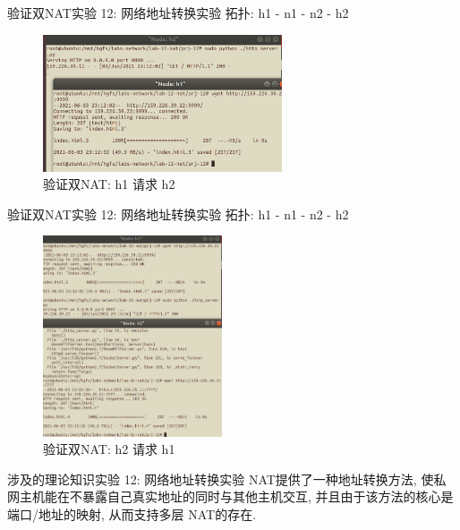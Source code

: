 \documentclass{beamer}
\begin{document}
\begin{frame}{验证双NAT}{实验 12: 网络地址转换实验}
    拓扑: h1 - n1 - n2 - h2
    \begin{figure}[h]
        \centering %
        \includegraphics[width=200pt]{
            ../lab-12-nat/readme.assets/p3-a.png}
        \caption{验证双NAT: h1 请求 h2} %
    \end{figure}
\end{frame}
\begin{frame}{验证双NAT}{实验 12: 网络地址转换实验}
    拓扑: h1 - n1 - n2 - h2
    \begin{figure}[h]
        \centering %
        \includegraphics[width=150pt]{
            ../lab-12-nat/readme.assets/p3-b.png}
        \caption{验证双NAT: h2 请求 h1} %
    \end{figure}
\end{frame}

\begin{frame}{涉及的理论知识}{实验 12: 网络地址转换实验}
    NAT提供了一种地址转换方法, 使私网主机能在不暴露自己真实地址的同时与其他主机交互, 并且由于该方法的核心是端口/地址的映射, 从而支持多层 NAT的存在.
\end{frame}



\end{document}
